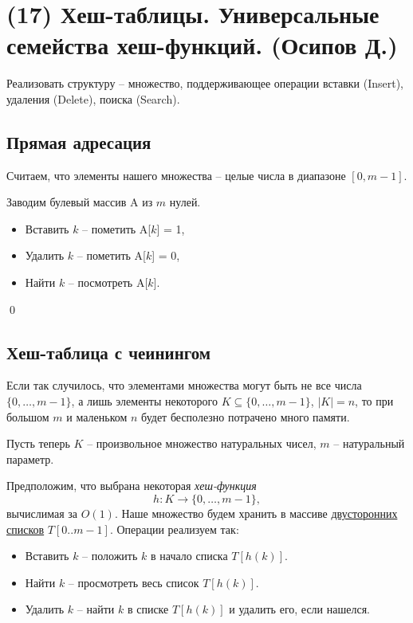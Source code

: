 \section{(17) Хеш-таблицы. Универсальные семейства хеш-функций. (Осипов Д.)}

\begin{problem*}
	Реализовать структуру -- множество, поддерживающее операции вставки (Insert), удаления (Delete), поиска (Search).
\end{problem*}
\subsection{Прямая адресация}
Считаем, что элементы нашего множества -- целые числа в диапазоне $[0, m-1]$.

 Заводим булевый массив A из $m$ нулей. 
\begin{itemize}
    \item Вставить $k$ -- пометить A[$k$] = 1,
    \item Удалить $k$ -- пометить A[$k$] = 0,
    \item Найти $k$ -- посмотреть A[$k$].
\end{itemize}\qed

\subsection{Хеш-таблица с чеинингом}
Если так случилось, что элементами множества могут быть не все числа $\{0, \ldots, m-1\}$, а лишь элементы некоторого $K \subseteq \{0, \ldots, m-1\}$, $|K| = n$, то при большом $m$ и маленьком $n$ будет бесполезно потрачено много памяти.

Пусть теперь $K$ -- произвольное множество натуральных чисел, $m$ -- натуральный параметр.


Предположим, что выбрана некоторая \textit{хеш-функция} $$h: K \rightarrow \{0, \ldots, m-1\},$$ вычислимая за $O(1)$. Наше множество будем хранить в массиве \underline{двусторонних списков} $T[0..m-1]$. Операции реализуем так:
\begin{itemize}
    \item Вставить $k$ -- положить $k$ в начало списка $T[h(k)]$.
    \item Найти $k$ -- просмотреть весь список $T[h(k)]$.
    \item Удалить $k$ -- найти $k$ в списке $T[h(k)]$ и удалить его, если нашелся.
\end{itemize}

